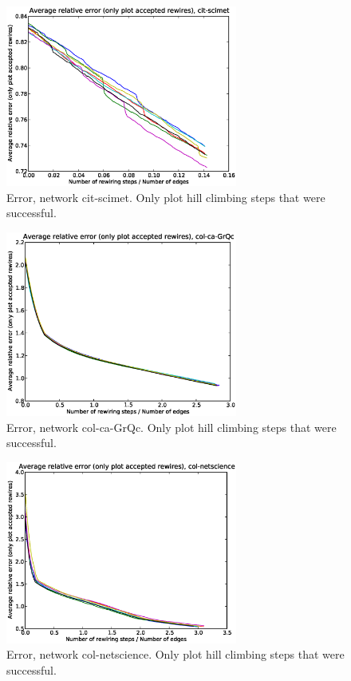 \begin{figure}[p]
\centering
\includegraphics[width=3in]{Figures/acceptedOnly-cit-scimet.eps}
\caption{Error, network cit-scimet.  Only plot hill climbing steps that were successful.}
\label{fig:errors-cit-scimet}
\end{figure}

\begin{figure}[p]
\centering
\includegraphics[width=3in]{Figures/acceptedOnly-col-ca-GrQc.eps}
\caption{Error, network col-ca-GrQc.  Only plot hill climbing steps that were successful.}
\label{fig:errors-col-ca-GrQc}
\end{figure}

\begin{figure}[p]
\centering
\includegraphics[width=3in]{Figures/acceptedOnly-col-netscience.eps}
\caption{Error, network col-netscience.  Only plot hill climbing steps that were successful.}
\label{fig:errors-col-netscience}
\end{figure}

